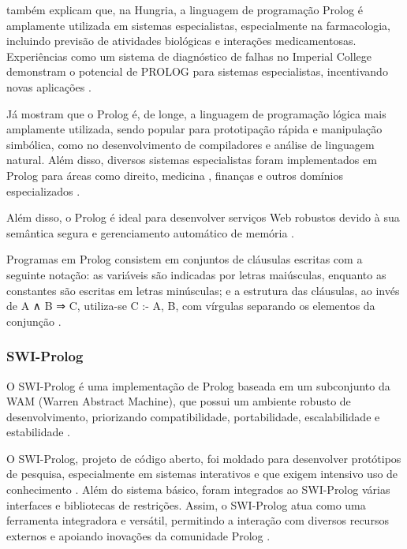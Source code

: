 \textcite{keithclark} também explicam que, na Hungria, a linguagem de programação Prolog é amplamente utilizada em sistemas especialistas, especialmente na farmacologia, incluindo previsão de atividades biológicas e interações medicamentosas. Experiências como um sistema de diagnóstico de falhas no Imperial College demonstram o potencial de PROLOG para sistemas especialistas, incentivando novas aplicações \cite{keithclark} .

Já \textcite{stuartrussel} mostram que o Prolog é, de longe, a linguagem de programação lógica mais amplamente utilizada, sendo popular para prototipação rápida e manipulação simbólica, como no desenvolvimento de compiladores e análise de linguagem natural. Além disso, diversos sistemas especialistas foram implementados em Prolog para áreas como direito, medicina \cite{jimmysingla}, finanças e outros domínios especializados \cite{stuartrussel}.

Além disso, o Prolog é ideal para desenvolver serviços Web robustos devido à sua semântica segura e gerenciamento automático de memória \cite{wielemaker}.

Programas em Prolog consistem em conjuntos de cláusulas escritas com a seguinte notação:  as variáveis são indicadas por letras maiúsculas, enquanto as constantes são escritas em letras minúsculas; e  a estrutura das cláusulas, ao invés de A ∧ B ⇒ C, utiliza-se C :- A, B, com vírgulas separando os elementos da conjunção \cite{stuartrussel}.

\subsubsection{SWI-Prolog}

O SWI-Prolog é uma implementação de Prolog baseada em um subconjunto da WAM (Warren Abstract Machine), que possui um ambiente robusto de desenvolvimento, priorizando compatibilidade, portabilidade, escalabilidade e estabilidade \cite{wielemakerswiprolog}. 

O SWI-Prolog, projeto de código aberto, foi moldado para desenvolver protótipos de pesquisa, especialmente em sistemas interativos e que exigem intensivo uso de conhecimento \cite{wielemakerswiprolog2}. Além do sistema básico, foram integrados ao SWI-Prolog várias interfaces e bibliotecas de restrições. Assim, o SWI-Prolog atua como uma ferramenta integradora e versátil, permitindo a interação com diversos recursos externos e apoiando inovações da comunidade Prolog \cite{wielemakerswiprolog2}.

